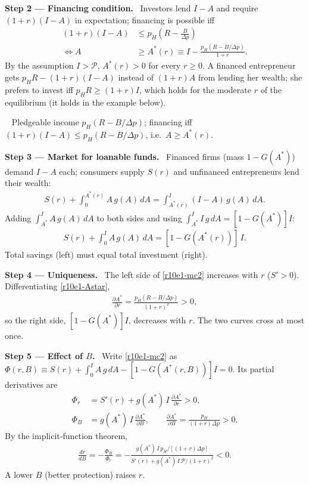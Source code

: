 \documentclass[11pt,a4paper]{article}
\newcommand{\step}[2]{\par\medskip\noindent\textbf{Step #1 --- #2.}~}
\newcommand{\answer}[1]{\par\smallskip\noindent\fbox{\textbf{Answer\if\relax\detokenize{#1}\relax\else\ #1\fi.}}~}
\newcommand{\Pc}{\mathcal{P}}
\begin{document}
\step{2}{Financing condition} Investors lend $I-A$ and require $(1+r)(I-A)$ in expectation; financing is possible iff
\begin{align}
  (1+r)(I-A) &\leq p_H\left(R-\frac{B}{\Delta p}\right) \label{r10e1-fc}\\
  \iff A &\geq A^*(r)\equiv I-\frac{p_H(R-B/\Delta p)}{1+r}. \label{r10e1-Astar}
\end{align}
By the assumption $I>\Pc$, $A^*(r)>0$ for every $r\geq0$. A financed entrepreneur gets $p_HR-(1+r)(I-A)$ instead of $(1+r)A$ from lending her wealth; she prefers to invest iff $p_HR\geq(1+r)I$, which holds for the moderate $r$ of the equilibrium (it holds in the example below).

\answer{(i)} Pledgeable income $p_H(R-B/\Delta p)$; financing iff $(1+r)(I-A)\leq p_H(R-B/\Delta p)$, i.e.\ $A\geq A^*(r)$.

\step{3}{Market for loanable funds} Financed firms (mass $1-G(A^*)$) demand $I-A$ each; consumers supply $S(r)$ and unfinanced entrepreneurs lend their wealth:
\begin{align}
  S(r)+\int_0^{A^*(r)}A\,g(A)\,dA = \int_{A^*(r)}^{I}(I-A)\,g(A)\,dA. \label{r10e1-mc}
\end{align}
Adding $\int_{A^*}^{I}A\,g(A)\,dA$ to both sides and using $\int_{A^*}^{I}I\,g\,dA=[1-G(A^*)]I$:
\begin{align}
  S(r)+\int_0^{I}A\,g(A)\,dA = [1-G(A^*(r))]\,I. \label{r10e1-mc2}
\end{align}
Total savings (left) must equal total investment (right).

\step{4}{Uniqueness} The left side of \eqref{r10e1-mc2} increases with $r$ ($S'>0$). Differentiating \eqref{r10e1-Astar},
\begin{align}
  \frac{\partial A^*}{\partial r} = \frac{p_H(R-B/\Delta p)}{(1+r)^2}>0, \label{r10e1-dAr}
\end{align}
so the right side, $[1-G(A^*)]I$, decreases with $r$. The two curves cross at most once.

\step{5}{Effect of $B$} Write \eqref{r10e1-mc2} as $\Phi(r,B)\equiv S(r)+\int_0^IA\,g\,dA-[1-G(A^*(r,B))]I=0$. Its partial derivatives are
\begin{align}
  \Phi_r &= S'(r)+g(A^*)\,I\,\frac{\partial A^*}{\partial r}>0, \label{r10e1-Phir}\\
  \Phi_B &= g(A^*)\,I\,\frac{\partial A^*}{\partial B}, \qquad \frac{\partial A^*}{\partial B}=\frac{p_H}{(1+r)\Delta p}>0. \label{r10e1-PhiB}
\end{align}
By the implicit-function theorem,
\begin{align}
  \frac{dr}{dB} = -\frac{\Phi_B}{\Phi_r} = -\frac{g(A^*)\,I\,p_H/[(1+r)\Delta p]}{S'(r)+g(A^*)\,I\,\Pc/(1+r)^2}<0. \label{r10e1-drdB}
\end{align}
A lower $B$ (better protection) raises $r$.
\end{document}
